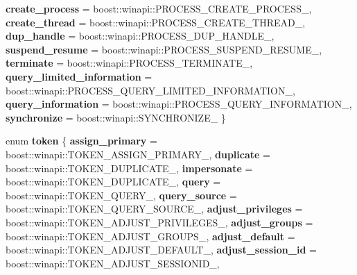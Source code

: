 \begin{DoxyCompactItemize}
{\bfseries create\+\_\+process} = boost\+:\+:winapi\+:\+:P\+R\+O\+C\+E\+S\+S\+\_\+\+C\+R\+E\+A\+T\+E\+\_\+\+P\+R\+O\+C\+E\+S\+S\+\_\+, 
{\bfseries create\+\_\+thread} = boost\+:\+:winapi\+:\+:P\+R\+O\+C\+E\+S\+S\+\_\+\+C\+R\+E\+A\+T\+E\+\_\+\+T\+H\+R\+E\+A\+D\+\_\+, 
\newline
{\bfseries dup\+\_\+handle} = boost\+:\+:winapi\+:\+:P\+R\+O\+C\+E\+S\+S\+\_\+\+D\+U\+P\+\_\+\+H\+A\+N\+D\+L\+E\+\_\+, 
{\bfseries suspend\+\_\+resume} = boost\+:\+:winapi\+:\+:P\+R\+O\+C\+E\+S\+S\+\_\+\+S\+U\+S\+P\+E\+N\+D\+\_\+\+R\+E\+S\+U\+M\+E\+\_\+, 
{\bfseries terminate} = boost\+:\+:winapi\+:\+:P\+R\+O\+C\+E\+S\+S\+\_\+\+T\+E\+R\+M\+I\+N\+A\+T\+E\+\_\+, 
{\bfseries query\+\_\+limited\+\_\+information} = boost\+:\+:winapi\+:\+:P\+R\+O\+C\+E\+S\+S\+\_\+\+Q\+U\+E\+R\+Y\+\_\+\+L\+I\+M\+I\+T\+E\+D\+\_\+\+I\+N\+F\+O\+R\+M\+A\+T\+I\+O\+N\+\_\+, 
\newline
{\bfseries query\+\_\+information} = boost\+:\+:winapi\+:\+:P\+R\+O\+C\+E\+S\+S\+\_\+\+Q\+U\+E\+R\+Y\+\_\+\+I\+N\+F\+O\+R\+M\+A\+T\+I\+O\+N\+\_\+, 
{\bfseries synchronize} = boost\+:\+:winapi\+:\+:S\+Y\+N\+C\+H\+R\+O\+N\+I\+Z\+E\+\_\+
 \}
\item 
\mbox{\label{structdistant_1_1access__rights_a6b4d9e837868c8c15cf407e4c80d7f3c}} 
enum {\bfseries token} \{ \newline
{\bfseries assign\+\_\+primary} = boost\+:\+:winapi\+:\+:T\+O\+K\+E\+N\+\_\+\+A\+S\+S\+I\+G\+N\+\_\+\+P\+R\+I\+M\+A\+R\+Y\+\_\+, 
{\bfseries duplicate} = boost\+:\+:winapi\+:\+:T\+O\+K\+E\+N\+\_\+\+D\+U\+P\+L\+I\+C\+A\+T\+E\+\_\+, 
{\bfseries impersonate} = boost\+:\+:winapi\+:\+:T\+O\+K\+E\+N\+\_\+\+D\+U\+P\+L\+I\+C\+A\+T\+E\+\_\+, 
{\bfseries query} = boost\+:\+:winapi\+:\+:T\+O\+K\+E\+N\+\_\+\+Q\+U\+E\+R\+Y\+\_\+, 
\newline
{\bfseries query\+\_\+source} = boost\+:\+:winapi\+:\+:T\+O\+K\+E\+N\+\_\+\+Q\+U\+E\+R\+Y\+\_\+\+S\+O\+U\+R\+C\+E\+\_\+, 
{\bfseries adjust\+\_\+privileges} = boost\+:\+:winapi\+:\+:T\+O\+K\+E\+N\+\_\+\+A\+D\+J\+U\+S\+T\+\_\+\+P\+R\+I\+V\+I\+L\+E\+G\+E\+S\+\_\+, 
{\bfseries adjust\+\_\+groups} = boost\+:\+:winapi\+:\+:T\+O\+K\+E\+N\+\_\+\+A\+D\+J\+U\+S\+T\+\_\+\+G\+R\+O\+U\+P\+S\+\_\+, 
{\bfseries adjust\+\_\+default} = boost\+:\+:winapi\+:\+:T\+O\+K\+E\+N\+\_\+\+A\+D\+J\+U\+S\+T\+\_\+\+D\+E\+F\+A\+U\+L\+T\+\_\+, 
\newline
{\bfseries adjust\+\_\+session\+\_\+id} = boost\+:\+:winapi\+:\+:T\+O\+K\+E\+N\+\_\+\+A\+D\+J\+U\+S\+T\+\_\+\+S\+E\+S\+S\+I\+O\+N\+I\+D\+\_\+, 

\end{DoxyCompactItemize}
